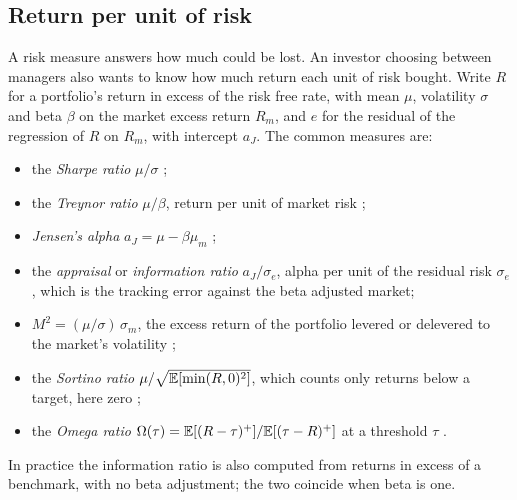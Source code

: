 \begin{chapterrefs}
\FloatBarrier
\section{Return per unit of risk}
\label{sec8:ratios}

A risk measure answers how much could be lost. An investor choosing between managers also wants to
know how much return each unit of risk bought. Write $R$ for a portfolio's return in excess of the
risk free rate, with mean $\mu$, volatility $\sigma$ and beta $\beta$ on the market excess return
$R_m$, and $e$ for the residual of the regression of $R$ on $R_m$, with intercept $a_J$. The common
measures are:
\begin{itemize}
  \item the \emph{Sharpe ratio} $\mu/\sigma$ \parencite{sharpe1966,sharpe1994};
  \item the \emph{Treynor ratio} $\mu/\beta$, return per unit of market risk \parencite{treynor1965};
  \item \emph{Jensen's alpha} $a_J=\mu-\beta\mu_m$ \parencite{jensen1968};
  \item the \emph{appraisal} or \emph{information ratio} $a_J/\sigma_e$, alpha per unit of the
        residual risk $\sigma_e$, which is the tracking error against the beta adjusted market;
  \item $M^2=(\mu/\sigma)\,\sigma_m$, the excess return of the portfolio levered or delevered to the
        market's volatility \parencite{modigliani1997};
  \item the \emph{Sortino ratio} $\mu/\sqrt{\mathbb{E}[\min(R,0)^2]}$, which counts only returns below a
        target, here zero \parencite{sortino1994};
  \item the \emph{Omega ratio} $\Omega(\tau)=\mathbb{E}[(R-\tau)^+]/\mathbb{E}[(\tau-R)^+]$ at a threshold $\tau$
        \parencite{keating2002}.
\end{itemize}
In practice the information ratio is also computed from returns in excess of a benchmark, with no
beta adjustment; the two coincide when beta is one.


\end{chapterrefs}
